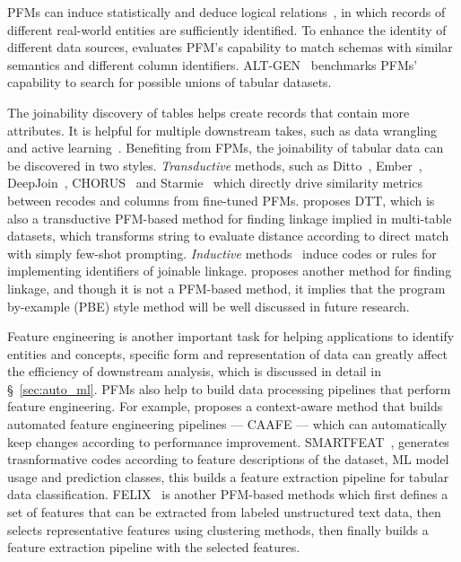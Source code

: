 PFMs can induce statistically and deduce logical relations~\cite{Wang2023SoloDD, CHORUS, constructKG,KGobjectrecognition,tabulargeneration, entityresolution}, in which records of different real-world entities are sufficiently identified. To enhance the identity of different data sources, \cite{LLMschema} evaluates PFM's capability to match schemas with similar semantics and different column identifiers. ALT-GEN~\cite{tabulargeneration} benchmarks PFMs' capability to search for possible unions of tabular datasets.
  
The joinability discovery of tables helps create records that contain more attributes. It is helpful for multiple downstream takes, such as data wrangling~\cite{FMwrangling} and active learning~\cite{ActiveLearning}. Benefiting from FPMs, the joinability of tabular data can be discovered in two styles. \textit{Transductive} methods, such as Ditto~\cite{Ditto}, Ember~\cite{Ember}, DeepJoin~\cite{DeepJoin}, CHORUS~\cite{CHORUS} and Starmie~\cite{Starmie} which directly drive similarity metrics between recodes and columns from fine-tuned PFMs. \cite{Nobari2023DTTAE} proposes DTT, which is also a transductive PFM-based method for finding linkage implied in multi-table datasets, which transforms string to evaluate distance according to direct match with simply few-shot prompting. \textit{Inductive} methods~\cite{jain2022jigsaw, lyu2024automatic} induce codes or rules for implementing identifiers of joinable linkage. \cite{zuo2022spine} proposes another method for finding linkage, and though it is not a PFM-based method, it implies that the program by-example (PBE) style method will be well discussed in future research.
  
  Feature engineering is another important task for helping applications to identify entities and concepts, specific form and representation of data can greatly affect the efficiency of downstream analysis, which is discussed in detail in \S~\ref{sec:auto_ml}. PFMs also help to build data processing pipelines that perform feature engineering. For example, \cite{Hollmann2023LargeLM} proposes a context-aware method that builds automated feature engineering pipelines — CAAFE — which can automatically keep changes according to performance improvement. SMARTFEAT~\cite{LinDJZ24}, generates trasnformative codes according to feature descriptions of the dataset, ML model usage and prediction classes, this builds a feature extraction pipeline for tabular data classification. FELIX~\cite{malberg2024felix} is another PFM-based methods which first defines a set of features that can be extracted from labeled unstructured text data, then selects representative features using clustering methods, then finally builds a feature extraction pipeline with the selected features. 

